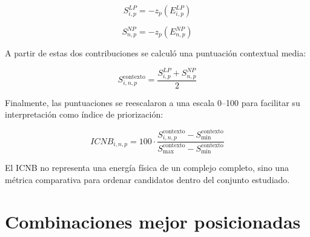 \documentclass[
  spanish,
  a4paper,
  12pt,
  oneside,
  openany]{memoir}
\begin{document}
\begin{equation*}
S^{LP}_{i,p} = -z_p(E^{LP}_{i,p})
\end{equation*}

\begin{equation*}
S^{NP}_{n,p} = -z_p(E^{NP}_{n,p})
\end{equation*}

A partir de estas dos contribuciones se calculó una puntuación
contextual media:

\begin{equation*}
S^{\mathrm{contexto}}_{i,n,p} =
\frac{S^{LP}_{i,p} + S^{NP}_{n,p}}{2}
\end{equation*}

Finalmente, las puntuaciones se reescalaron a una escala 0--100 para
facilitar su interpretación como índice de priorización:

\begin{equation*}
ICNB_{i,n,p} =
100 \cdot
\frac{
S^{\mathrm{contexto}}_{i,n,p} - S^{\mathrm{contexto}}_{\min}
}{
S^{\mathrm{contexto}}_{\max} - S^{\mathrm{contexto}}_{\min}
}
\end{equation*}

El ICNB no representa una energía física de un complejo completo, sino
una métrica comparativa para ordenar candidatos dentro del conjunto
estudiado.

\section{Combinaciones mejor posicionadas}
\end{document}
